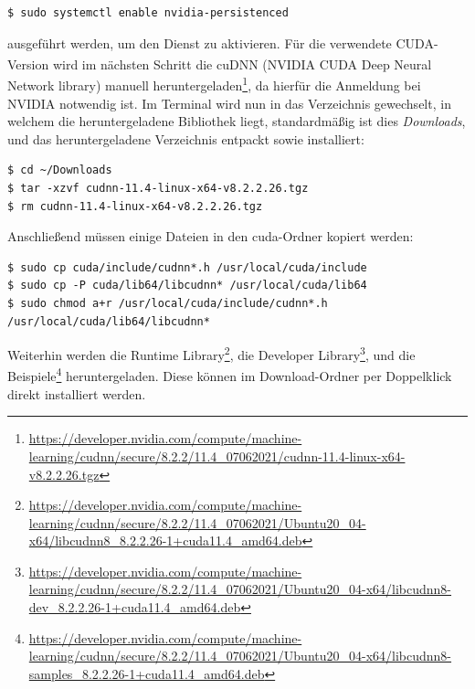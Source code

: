 \documentclass[12pt, oneside]{article}
\begin{document}
\begin{verbatim}
$ sudo systemctl enable nvidia-persistenced
\end{verbatim}
ausgeführt werden, um den Dienst zu aktivieren. Für die verwendete CUDA-Version wird im nächsten Schritt die cuDNN (NVIDIA CUDA\textsuperscript{\textregistered} Deep Neural Network library) manuell heruntergeladen\footnote{\href{{https://developer.nvidia.com/compute/machine-learning/cudnn/secure/8.2.2/11.4_07062021/cudnn-11.4-linux-x64-v8.2.2.26.tgz}}{\url{https://developer.nvidia.com/compute/machine-learning/cudnn/secure/8.2.2/11.4_07062021/cudnn-11.4-linux-x64-v8.2.2.26.tgz}}}, da hierfür die Anmeldung bei NVIDIA notwendig ist.
Im Terminal wird nun in das Verzeichnis gewechselt, in welchem die heruntergeladene Bibliothek liegt, standardmäßig ist dies \textit{Downloads}, und das heruntergeladene Verzeichnis entpackt sowie installiert:

\begin{verbatim}
$ cd ~/Downloads
$ tar -xzvf cudnn-11.4-linux-x64-v8.2.2.26.tgz
$ rm cudnn-11.4-linux-x64-v8.2.2.26.tgz
\end{verbatim}    
Anschließend müssen einige Dateien in den cuda-Ordner kopiert werden:

\begin{verbatim}
$ sudo cp cuda/include/cudnn*.h /usr/local/cuda/include 
$ sudo cp -P cuda/lib64/libcudnn* /usr/local/cuda/lib64 
$ sudo chmod a+r /usr/local/cuda/include/cudnn*.h /usr/local/cuda/lib64/libcudnn*
\end{verbatim}
Weiterhin werden die Runtime Library\footnote{\href{https://developer.nvidia.com/compute/machine-learning/cudnn/secure/8.2.2/11.4_07062021/Ubuntu20_04-x64/libcudnn8_8.2.2.26-1+cuda11.4_amd64.deb}{\url{https://developer.nvidia.com/compute/machine-learning/cudnn/secure/8.2.2/11.4_07062021/Ubuntu20_04-x64/libcudnn8_8.2.2.26-1+cuda11.4_amd64.deb}}}, die Developer Library\footnote{\href{https://developer.nvidia.com/compute/machine-learning/cudnn/secure/8.2.2/11.4_07062021/Ubuntu20_04-x64/libcudnn8-dev_8.2.2.26-1+cuda11.4_amd64.deb}{\url{https://developer.nvidia.com/compute/machine-learning/cudnn/secure/8.2.2/11.4_07062021/Ubuntu20_04-x64/libcudnn8-dev_8.2.2.26-1+cuda11.4_amd64.deb}}}, und die Beispiele\footnote{\href{https://developer.nvidia.com/compute/machine-learning/cudnn/secure/8.2.2/11.4_07062021/Ubuntu20_04-x64/libcudnn8-samples_8.2.2.26-1+cuda11.4_amd64.deb}{\url{https://developer.nvidia.com/compute/machine-learning/cudnn/secure/8.2.2/11.4_07062021/Ubuntu20_04-x64/libcudnn8-samples_8.2.2.26-1+cuda11.4_amd64.deb}}} heruntergeladen. Diese können im Download-Ordner per Doppelklick direkt installiert werden.
\end{document}

